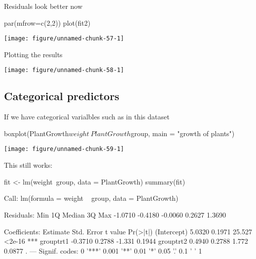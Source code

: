\documentclass[a4paper,twoside]{tufte-book}\usepackage[]{graphicx}\usepackage[]{color}
\makeatletter
\def\maxwidth{ %
	\ifdim\Gin@nat@width>\linewidth
	\linewidth
	\else
	\Gin@nat@width
	\fi
}
\makeatother
\begin{document}
\begin{Anhang}
Residuals look better now

\begin{Schunk}
\begin{Sinput}
par(mfrow=c(2,2))
plot(fit2)
\end{Sinput}

\texttt{[image: figure/unnamed-chunk-57-1]} \end{Schunk}

Plotting the results

\begin{Schunk}

\texttt{[image: figure/unnamed-chunk-58-1]} \end{Schunk}

\subsection{Categorical predictors}

If we have categorical varialbles such as in this dataset

\begin{Schunk}
\begin{Sinput}
boxplot(PlantGrowth$weight~PlantGrowth$group, main = "growth of plants")
\end{Sinput}

\texttt{[image: figure/unnamed-chunk-59-1]} \end{Schunk}

This still works:

\begin{Schunk}
\begin{Sinput}
fit <- lm(weight~group, data = PlantGrowth)
summary(fit)
\end{Sinput}
\begin{Soutput}

Call:
lm(formula = weight ~ group, data = PlantGrowth)

Residuals:
    Min      1Q  Median      3Q     Max 
-1.0710 -0.4180 -0.0060  0.2627  1.3690 

Coefficients:
            Estimate Std. Error t value Pr(>|t|)    
(Intercept)   5.0320     0.1971  25.527   <2e-16 ***
grouptrt1    -0.3710     0.2788  -1.331   0.1944    
grouptrt2     0.4940     0.2788   1.772   0.0877 .  
---
Signif. codes:  0 '***' 0.001 '**' 0.01 '*' 0.05 '.' 0.1 ' ' 1


\end{Soutput}
\end{Schunk}
\end{Anhang}
\end{document}
